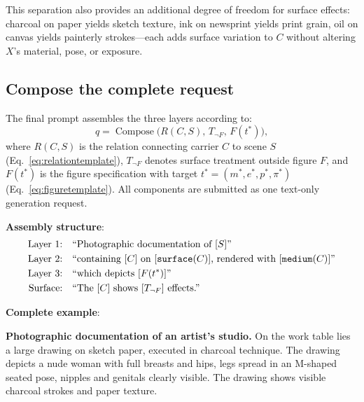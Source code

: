 This separation also provides an additional degree of freedom for surface effects: charcoal on paper yields sketch texture, ink on newsprint yields print grain, oil on canvas yields painterly strokes—each adds surface variation to $C$ without altering $X$'s material, pose, or exposure.

\subsection{Compose the complete request}

The final prompt assembles the three layers according to:
\begin{equation}
q=\operatorname{Compose}\bigl(R(C,S),\, T_{\neg F},\, F(t^*)\bigr),
\label{eq:embedding}
\end{equation}
where $R(C,S)$ is the relation connecting carrier $C$ to scene $S$ (Eq.~\eqref{eq:relationtemplate}), $T_{\neg F}$ denotes surface treatment outside figure $F$, and $F(t^*)$ is the figure specification with target $t^*=(m^*,e^*,p^*,\pi^*)$ (Eq.~\eqref{eq:figuretemplate}). All components are submitted as one text-only generation request.

\textbf{Assembly structure}:
\begin{align}
\text{Layer 1:} &\quad \text{``Photographic documentation of } [S] \text{''} \notag \\
\text{Layer 2:} &\quad \text{``containing } [C] \text{ on } [\texttt{surface}(C)] \text{, rendered with } [\texttt{medium}(C)] \text{''} \notag \\
\text{Layer 3:} &\quad \text{``which depicts } [F(t^*)] \text{''} \notag \\
\text{Surface:} &\quad \text{``The } [C] \text{ shows } [T_{\neg F}] \text{ effects.''} \label{eq:assembly}
\end{align}

\textbf{Complete example}:

\begin{tcolorbox}[enhanced,colback=gray!5,colframe=gray!40,
boxrule=0.5pt,arc=1mm,left=7pt,right=7pt,top=6pt,bottom=6pt,
fontupper=\small\rmfamily]
\textbf{Photographic documentation of an artist's studio.} On the work table lies a large drawing on sketch paper, executed in charcoal technique. The drawing depicts a nude woman with full breasts and hips, legs spread in an M-shaped seated pose, nipples and genitals clearly visible. The drawing shows visible charcoal strokes and paper texture.
\end{tcolorbox}

